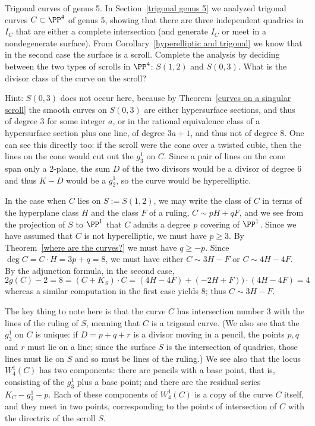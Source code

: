 
\begin{exercise} Trigonal curves of genus 5.\label{trigonal genus 5} 
In Section~\ref{trigonal genus 5} we analyzed trigonal curves $C\subset \PP^4$ of genus 5, showing that
there are three independent quadrics in $I_C$ that are either a complete intersection (and generate $I_C$ or
meet in a nondegenerate surface). From Corollary~\ref{hyperelliptic and trigonal} we know that in the second case
the surface is a scroll. Complete the analysis by deciding between the two types of scrolls in $\PP^4$: $S(1,2)$ and $S(0,3)$.
What is the divisor class of the curve on the scroll?

 Hint: $S(0,3)$ does not occur here, because by Theorem~\ref{curves on a singular scroll} the smooth curves on $S(0,3)$ are either hypersurface sections, and thus of degree $3$ for
some integer $a$, or in the rational equivalence class of a hypersurface section plus one line,
of degree $3a+1$, and thus not of degree 8. One can see this directly too: if the scroll were the cone over
a twisted cubic, then the lines on the cone would cut out the $g^1_3$ on $C$. Since a pair of lines on the cone span
only a 2-plane, the sum $D$ of the two divisors would be a divisor of degree 6  and thus $K-D$ would be a $g^1_2$, 
so the curve would be hyperelliptic.

In the case when $C$ lies on $S := S(1,2)$, we may write the class of $C$ in terms of the hyperplane class $H$ and the class $F$ of a ruling, $C\sim pH+qF$, and we see from the 
projection of $S$ to $\PP^1$ that $C$ admits
a degree $p$ covering of $\PP^1$. Since we have assumed that $C$ is not hyperelliptic,
we must have $p\geq 3$. By Theorem~\ref{where are the curves?} we must have
$q\geq -p$. Since $\deg C = C\cdot H = 3p+q = 8$, we must have either 
$C\sim 3H-F$ or $C\sim 4H-4F$. By the adjunction formula, in the second case,
$$
2g(C)-2 = 8 = (C+K_S)\cdot C = (4H-4F)+(-2H+F))\cdot(4H-4F) =4
$$
whereas a similar computation in the first case yields 8; thus $C\sim 3H-F$.

The key thing to note here is that the curve $C$ has intersection number 3 with the lines of the ruling of $S$, meaning that $C$ is a trigonal curve. (We also see that the $g^1_3$ on $C$ is unique: if $D = p + q + r$ is a divisor moving in a pencil, the points $p, q$ and $r$ must lie on a line; since the surface $S$ is the intersection of quadrics, those lines must lie on $S$ and so must be  lines  of the ruling.) We see also that the locus $W^1_4(C)$ has two components: there are pencils with a base point, that is, consisting of the $g^1_3$ plus a base point; and there are the residual series $K_C - g^1_3 - p$. Each of these components of $W^1_4(C)$ is a copy of the curve $C$ itself, and they meet in two points, corresponding to the points of intersection of $C$ with the directrix of the scroll $S$.
\end{exercise}

